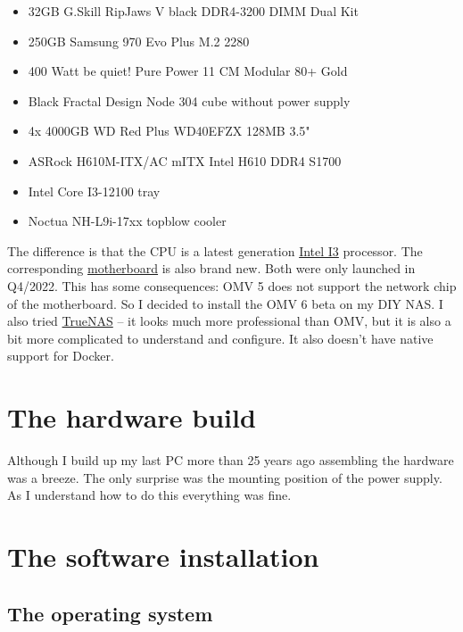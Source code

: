 \begin{itemize}
    \item 32GB G.Skill RipJaws V black DDR4-3200 DIMM Dual Kit
    \item 250GB Samsung 970 Evo Plus M.2 2280
    \item 400 Watt be quiet! Pure Power 11 CM Modular 80+ Gold
    \item Black Fractal Design Node 304 cube without power supply
    \item 4x 4000GB WD Red Plus WD40EFZX 128MB 3.5"
    \item ASRock H610M-ITX/AC mITX Intel H610 DDR4 S1700
    \item Intel Core I3-12100 tray
    \item Noctua NH-L9i-17xx topblow cooler
\end{itemize}

The difference is that the CPU is a latest generation
\href{https://www.intel.com/content/www/us/en/products/sku/134584/intel-core-i312100-processor-12m-cache-up-to-4-30-ghz/specifications.html?wapkw=12100}{Intel I3}
processor. The corresponding
\href{https://www.asrock.com/MB/Intel/H610M-ITXac/index.de.asp}{motherboard}
is also brand new. Both were only launched in Q4/2022. This has some
consequences: \gls{OMV} 5 does not support the network chip of the motherboard.
So I decided to install the \gls{OMV} 6 beta on my DIY \gls{NAS}. I also tried
\href{https://www.truenas.com/}{TrueNAS} -- it looks much more professional
than \gls{OMV}, but it is also a bit more complicated to understand and
configure. It also doesn't have native support for \gls{Docker}.

\section{The hardware build}

Although I build up my last PC more than 25 years ago assembling the
hardware was a breeze. The only surprise was the mounting position of the
power supply. As I understand how to do this everything was fine.

\section{The software installation}

\subsection{The operating system}

